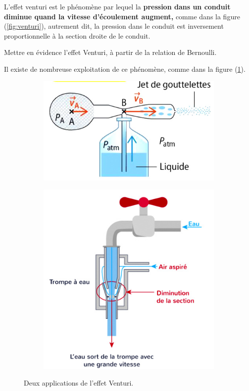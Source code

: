 \documentclass[11pt,a4paper]{article}
\begin{document}
L'effet venturi est le phénomène par lequel la \textbf{pression dans un conduit diminue quand la vitesse d'écoulement augment, }comme dans la figure (\ref{fig:venturi}), autrement dit, la pression dans le conduit est inversement proportionnelle à la section droite de le conduit. 

\begin{exo}
Mettre en évidence l'effet Venturi, à partir de la relation de Bernoulli. 
\vspace{5cm}
\end{exo}

Il existe de nombreuse exploitation de ce phénomène, comme dans la figure (\ref{fig:venturiapp}).

\begin{figure}[H]
\centering
\begin{subfigure}{.47\textwidth}
  \centering
  \includegraphics[width=.95\linewidth]{imgs/p9/parfum.jpg}  
\end{subfigure}
\begin{subfigure}{.4\textwidth}
  \centering
  \includegraphics[width=.95\linewidth]{imgs/p9/trompe.jpg}  
\end{subfigure}
\caption{Deux applications de l'effet Venturi.}
\label{fig:venturiapp}
\end{figure}
\end{document}

